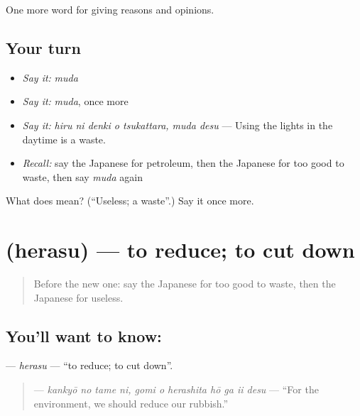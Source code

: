 \begin{grammarlens}[title={What you've built}]
One more word for giving reasons and opinions.
\end{grammarlens}

\subsection*{Your turn}
\begin{itemize}
\raggedright
  \item \emph{Say it:} \emph{muda}
  \item \emph{Say it:} \emph{muda}, once more
  \item \emph{Say it:} \emph{hiru ni denki o tsukattara, muda desu} — Using the lights in the daytime is a waste.
  \item \emph{Recall:} say the Japanese for petroleum, then the Japanese for too good to waste, then say \emph{muda} again
\end{itemize}

\begin{tcolorbox}[breakable,colback=teal!4,colframe=teal!35!black,title={Before you move on}]
What does  mean? (\textquotedblleft{}Useless; a waste\textquotedblright{}.) Say it once more.
\end{tcolorbox}
\section[\texorpdfstring{\ja{へらす} (herasu)}{へらす (herasu)}]{ (herasu) — to reduce; to cut down}

\label{lesson:JA-C338-herasu}



\begin{quote}
Before the new one: say the Japanese for too good to waste, then the Japanese for useless.
\end{quote}

\subsection*{You'll want to know: }
\textbf{} — \emph{herasu} — \textquotedblleft{}to reduce; to cut down\textquotedblright{}.

\begin{quote}
\textbf{    } — \emph{kankyō no tame ni, gomi o herashita hō ga ii desu} — \textquotedblleft{}For the environment, we should reduce our rubbish.\textquotedblright{}
\end{quote}

